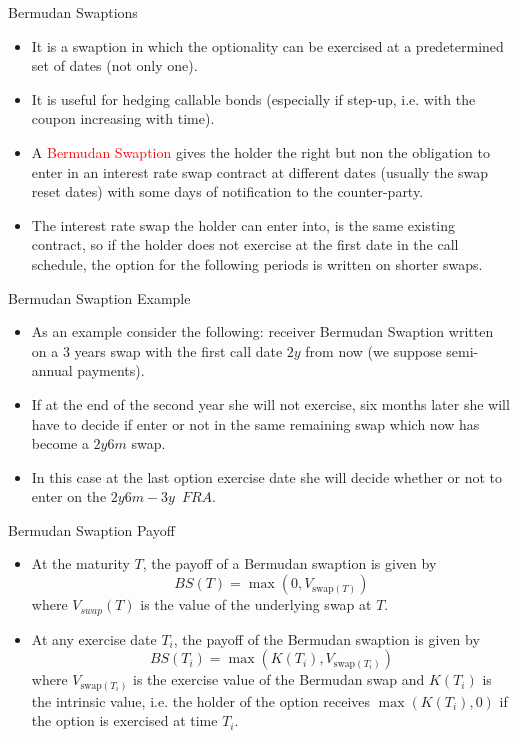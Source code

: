 \documentclass{beamer}
\begin{document}
\begin{frame}{Bermudan Swaptions}
	\begin{itemize}
		\item It is a swaption in which the optionality can be exercised at a predetermined set of dates (not only one).
		\item It is useful for hedging callable bonds (especially if step-up, i.e. with the coupon increasing with time).
		\item A \textcolor{red}{Bermudan Swaption} gives the holder the right but non the obligation to enter in an interest rate swap contract at different dates (usually the swap reset dates) with some days of notification to the counter-party.
		\item The interest rate swap the holder can enter into, is the same existing contract, so if the holder does not exercise at the first date in the call schedule, the option for the following periods is written on shorter swaps.
	\end{itemize}
\end{frame}

\begin{frame}{Bermudan Swaption Example}
	\begin{itemize}
		\item As an example consider the following: receiver Bermudan Swaption written on a 3 years swap with the first call date $2y$ from now (we suppose semi-annual payments).
		\item If at the end of the second year she will not exercise, six months later she will have to decide if enter or not in the same remaining swap which now has become a $2y6m$ swap.
		\item In this case at the last option exercise date she will decide whether or not to enter on the $2y6m-3y$~$FRA$.
	\end{itemize}
\end{frame}		

\begin{frame}{Bermudan Swaption Payoff}
	\begin{itemize}
		\item At the maturity $T$, the payoff of a Bermudan swaption is given by
		\begin{equation*}
			BS(T) = \max(0, V_{\text{swap}(T)})
		\end{equation*}
		where $V_{swap}(T)$ is the value of the underlying swap at $T$.
		\item At any exercise date $T_i$, the payoff of the Bermudan swaption is given by
		\begin{equation*}
			BS(T_i) = \max(K(T_i), V_{\text{swap}(T_i)})
		\end{equation*}
		where $V_{\text{swap}(T_i)}$ is the exercise value of the Bermudan swap and $K(T_i)$ is the intrinsic value, i.e. the holder of the option receives $\max(K(T_i), 0)$ if the option is exercised at time $T_i$.
	\end{itemize}
\end{frame}
\end{document}
